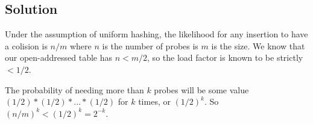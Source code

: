 \subsection*{Solution}

Under the assumption of uniform hashing, the likelihood for any insertion to have a colision is $n/m$ where $n$ is the number of probes is $m$ is the size. We know that our open-addressed table has $n < m/2$, so the load factor is known to be strictly $< 1/2$.

The probability of needing more than $k$ probes will be some value $(1/2)*(1/2)*...*(1/2)$ for $k$ times, or $(1/2)^k$. So $(n/m)^k < (1/2) ^k = 2^{-k}$.
